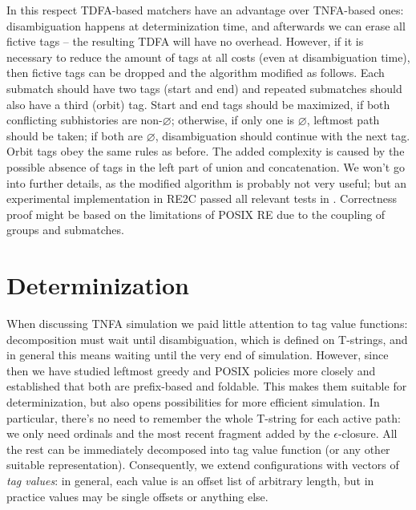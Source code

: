 \documentclass{article}
\theoremstyle{definition}
\begin{document}
\begin{multicols}{2}
In this respect TDFA-based matchers have an advantage over TNFA-based ones:
disambiguation happens at determinization time,
and afterwards we can erase all fictive tags -- the resulting TDFA will have no overhead.
However, if it is necessary to reduce the amount of tags at all costs (even at disambiguation time),
then fictive tags can be dropped and the algorithm modified as follows.
Each submatch should have two tags (start and end)
and repeated submatches should also have a third (orbit) tag.
Start and end tags should be maximized, if both conflicting subhistories are non-$\varnothing$;
otherwise, if only one is $\varnothing$, leftmost path should be taken;
if both are $\varnothing$, disambiguation should continue with the next tag.
Orbit tags obey the same rules as before.
The added complexity is caused by the possible absence of tags in the left part of union and concatenation.
We won't go into further details, as the modified algorithm is probably not very useful;
but an experimental implementation in RE2C passed all relevant tests in \cite{Fow03}.
Correctness proof might be based on the limitations of POSIX RE due to the coupling of groups and submatches.

\section{Determinization}\label{section_determinization}

When discussing TNFA simulation we paid little attention to tag value functions:
decomposition must wait until disambiguation, which is defined on T-strings,
and in general this means waiting until the very end of simulation.
However, since then we have studied leftmost greedy and POSIX policies more closely
and established that both are prefix-based and foldable.
This makes them suitable for determinization, but also opens possibilities for more efficient simulation.
In particular, there's no need to remember the whole T-string for each active path:
we only need ordinals and the most recent fragment added by the $\epsilon$-closure.
All the rest can be immediately decomposed into tag value function (or any other suitable representation).
Consequently, we extend configurations with vectors of \emph{tag values}:
in general, each value is an offset list of arbitrary length,
but in practice values may be single offsets or anything else.
\\


\end{multicols}
\end{document}
